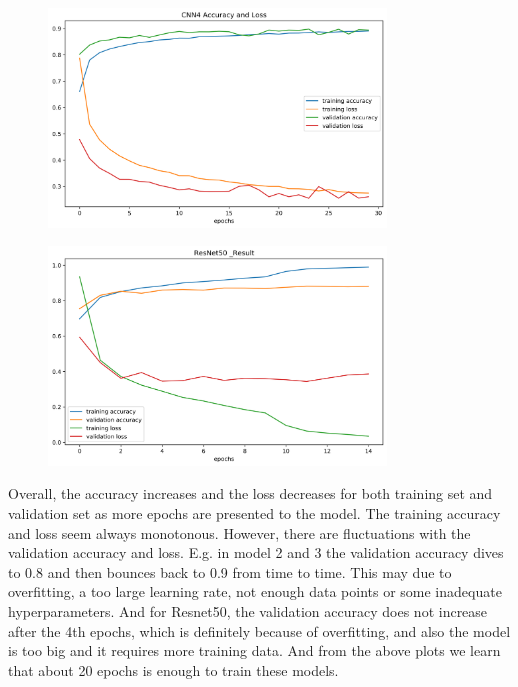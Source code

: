 \documentclass[12pt]{article}
\begin{document}
\begin{figure}[H]
\begin{center}
    \includegraphics[width=0.8\textwidth]{./plots/CNN4_Result.png}
\end{center}
\end{figure}
\begin{figure}[H]
\begin{center}
    \includegraphics[width=0.8\textwidth]{./plots/Resnet50_Result.png}
\end{center}
\end{figure}
\vspace*{-1.0cm}

Overall, the accuracy increases and the loss decreases for both training set and validation set as more epochs are presented to the model. The training accuracy and loss seem always monotonous. However, there are fluctuations with the validation accuracy and loss. E.g. in model 2 and 3 the validation accuracy dives to 0.8 and then bounces back to 0.9 from time to time. This may due to overfitting, a too large learning rate, not enough data points or some inadequate hyperparameters. And for Resnet50, the validation accuracy does not increase after the 4th epochs, which is definitely because of overfitting, and also the model is too big and it requires more training data. And from the above plots we learn that about 20 epochs is enough to train these models.
\end{document}
